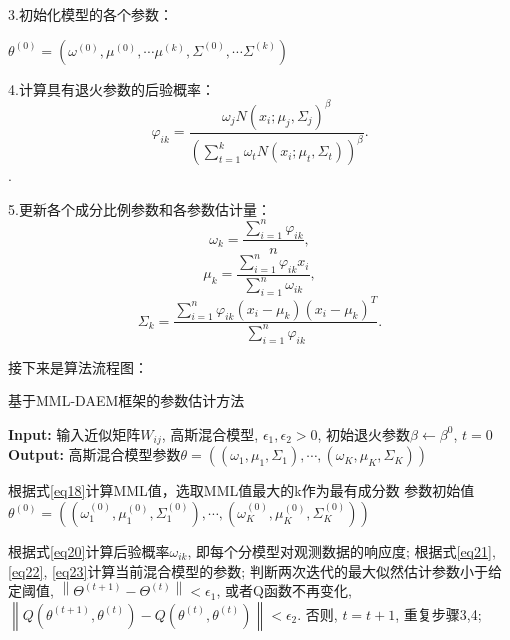 \documentclass[a4paper,12pt,openany,oneside,utf-8]{ctexbook}
\begin{document}
    3.初始化模型的各个参数：
    \begin{center}
        $\theta^{(0)}=(\omega^{(0)},\mu^{(0)},\cdots \mu^{(k)},\Sigma^{(0)},\cdots \Sigma^{(k)})$
    \end{center}
    
    4.计算具有退火参数的后验概率：
    \begin{equation}\label{eq20}
		\varphi_{i k}=\frac{\omega_j N(x_i;\mu_j,\Sigma_j)^\beta}{(\sum_{t=1}^k\omega_t N(x_i;\mu_t,\Sigma_t))^\beta}.
	\end{equation}.
	
	5.更新各个成分比例参数和各参数估计量：
	\begin{equation}\label{eq21}
		\omega_{k}=\frac{\sum_{i=1}^{n} \varphi_{i k}}{n},
	\end{equation}\begin{equation}\label{eq22}
		\mu_{k}=\frac{\sum_{i=1}^{n} \varphi_{i k} x_{i}}{\sum_{i=1}^{n} \omega_{i k}},
	\end{equation}\begin{equation}\label{eq23}
		\Sigma_{k}=\frac{\sum_{i=1}^{n} \varphi_{i k}\left(x_{i}-\mu_{k}\right)\left(x_{i}-\mu_{k}\right)^{T}}{\sum_{i=1}^{n} \varphi_{i k}}.
	\end{equation}
	
	接下来是算法流程图：
    \\[3pt]
    \begin{algorithm}
		\caption{基于MML-DAEM框架的参数估计方法} %
		\hspace*{0.02in} {\bf Input:} %
		输入近似矩阵$W_{i j}$, 高斯混合模型, $\epsilon_{1},\epsilon_{2}>0$, 初始退火参数$\beta\leftarrow\beta^{0}$, $t=0$\\
		\hspace*{0.02in} {\bf Output:} %
		高斯混合模型参数$\theta=\left(\left(\omega_{1}, \mu_{1}, \Sigma_{1}\right), \cdots,\left(\omega_{K}, \mu_{K}, \Sigma_{K}\right)\right)$
		\begin{algorithmic}[1]
		    \State 根据式\ref{eq18}计算MML值，选取MML值最大的k作为最有成分数
			\State 参数初始值$\theta^{(0)}=\left(\left(\omega_{1}^{(0)}, \mu_{1}^{(0)}, \Sigma_{1}^{(0)}\right), \cdots,\left(\omega_{K}^{(0)}, \mu_{K}^{(0)}, \Sigma_{K}^{(0)}\right)\right)$ %
			
			
			\State 根据式\ref{eq20}计算后验概率$\omega_{i k}$, 即每个分模型对观测数据的响应度;
			\State 根据式\ref{eq21}, \ref{eq22}, \ref{eq23}计算当前混合模型的参数;
			\State
			 判断两次迭代的最大似然估计参数小于给定阈值, $\left\|\Theta^{(t+1)}-\Theta^{(t)}\right\|<\epsilon_{1}$, 或者Q函数不再变化, $\left\|Q\left(\theta^{(t+1)},\theta^{(t)}\right)-Q\left(\theta^{(t)},\theta^{(t)}\right)\right\|<\epsilon_{2}$. 否则, $t=t+1$, 重复步骤3,4;
			 
			\EndWhile
		\end{algorithmic}
	\end{algorithm}
	
\end{document}

